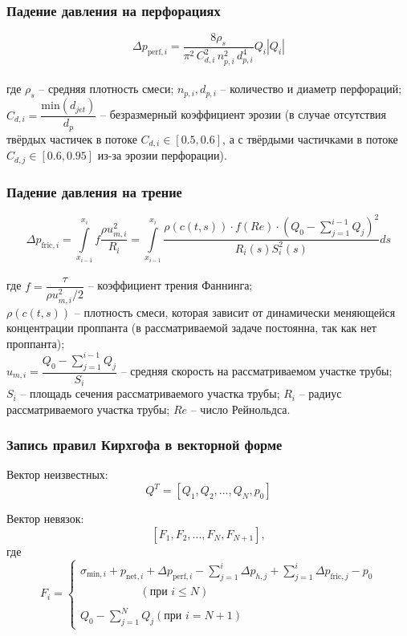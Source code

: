 \documentclass{beamer}
\begin{document}
\begin{frame}
\frametitle{Падение давления на перфорациях}
$$
\Delta p_{\text{perf},i}=\frac{8\rho_s}{\pi^2\,C_{d,i}^2\,n_{p,i}^2 \,d_{p,i}^4}Q_i\left|Q_i\right|
$$\\
где $\rho_s$ -- средняя плотность смеси;\newline
$n_{p,i}, d_{p,i}$ -- количество и диаметр перфораций;\newline\\
$C_{d,i}=\dfrac{\text{min}(d_{jet})}{d_p}$ -- безразмерный коэффициент эрозии (в случае отсутствия твёрдых частичек в потоке $C_{d,i}\in\left[0.5,0.6\right]$, а с твёрдыми частичками в потоке $C_{d,j}\in\left[0.6,0.95\right]$  из-за эрозии перфорации).

\end{frame}


\begin{frame}
\frametitle{Падение давления на трение}
\vspace*{-12mm}
$$
\Delta p_{\text{fric},i}=\int\limits_{x_{i-1}}^{x_i}{f\frac{\rho u_{m,i}^2}{R_i}}=\int\limits_{x_{i-1}}^{x_i}{\frac{\rho(c(t,s))\cdot f(Re)\cdot \left(Q_0-\sum\limits_{j=1}^{i-1}{Q_j}\right)^{\!2}}{R_i(s)S_i^2(s)}}ds
$$\\
\footnotesize
где $f=\dfrac{\tau}{\rho u_{m,i}^2/2}$ -- коэффициент трения Фаннинга;\newline\\
$\rho(c(t,s))$ -- плотность смеси, которая зависит от динамически меняющейся концентрации проппанта (в рассматриваемой задаче постоянна, так как нет проппанта);\newline\\
$u_{m,i}=\dfrac{Q_0-\sum\limits_{j=1}^{i-1}{Q_j}}{S_i}$ -- средняя скорость на рассматриваемом участке трубы;\newline\\
$S_i$ -- площадь сечения рассматриваемого участка трубы;\newline
$R_i$ -- радиус рассматриваемого участка трубы;\newline
$Re$ -- число Рейнольдса.
\normalsize
\end{frame}


\begin{frame}
\frametitle{Запись правил Кирхгофа в векторной форме}

Вектор неизвестных:
$$Q^T=\left[Q_1,Q_2,...,Q_N,p_0\right]$$

Вектор невязок:
$$\left[F_1,F_2,...,F_N,F_{N+1}\right],$$
где
$$
F_i=
\begin{cases}
\sigma_{\text{min},i}+p_{\text{net},i}+\Delta p_{\text{perf},i}-\sum\limits_{j=1}^{i}{\Delta p_{h,j}}+\sum\limits_{j=1}^{i}{\Delta p_{\text{fric},j}}-p_0\\\,\,\,\,\,\,\,\,\,\,\,\,\,\,\,\,\,\,\,\,\,\,\,\,\,\,\,\,\,\,\,\,\left(\text{при }i\leqslant N\right)\\\ \\
Q_0-\sum\limits_{j=1}^{N}{Q_j}\left(\text{при }i=N+1\right)
\end{cases}
$$

\end{frame}
\end{document}
